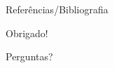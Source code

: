 \documentclass{beamer}
\begin{document}
\begin{darkframes}

\begin{frame}[allowframebreaks]{Referências/Bibliografia}
    
    \nocite{*}
\end{frame}

\begin{frame}{Obrigado!}
    \begin{center}
        \Huge Perguntas?
    \end{center}
\end{frame}

\end{darkframes}
\end{document}

